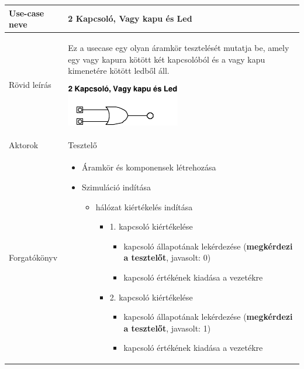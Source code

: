 	\begin{longtable}{| l | p{12cm} |}
	\hline
	\textbf{Use-case neve}   & {2 Kapcsoló, Vagy kapu és Led} \tabularnewline
	\hline\hline
	Rövid leírás    & {Ez a usecase egy olyan áramkör tesztelését mutatja be, amely egy vagy kapura kötött két kapcsolóból és a vagy kapu kimenetére kötött ledből áll.\newline
\begin{center}
\vspace{-15pt}
\includegraphics[scale=1.5]{dw/circuit_test3.pdf}
\vspace{-10pt}
\end{center}} \tabularnewline
	\hline
	Aktorok         & {Tesztelő} \tabularnewline
	\hline
	Forgatókönyv    &  \vspace{-15pt}
\begin{itemize}
\setlength{\itemsep}{0cm}%
\setlength{\parskip}{0cm}%
\setlength{\itemindent}{-10pt}%
\item Áramkör és komponensek létrehozása
\item Szimuláció indítása
\begin{itemize}
\setlength{\itemsep}{0cm}%
\setlength{\parskip}{0cm}%
\setlength{\itemindent}{-25pt}%
\item hálózat kiértékelés indítása
\begin{itemize}
\setlength{\itemsep}{0cm}%
\setlength{\parskip}{0cm}%
\setlength{\itemindent}{-25pt}%
	\item 1. kapcsoló kiértékelése
	\begin{itemize}
	\setlength{\itemsep}{0cm}%
	\setlength{\parskip}{0cm}%
	\setlength{\itemindent}{-25pt}%
		\item kapcsoló állapotának lekérdezése (\textbf{megkérdezi a tesztelőt}, javasolt: 0)
		\item kapcsoló értékének kiadása a vezetékre
	\end{itemize}
	\item 2. kapcsoló kiértékelése
	\begin{itemize}
	\setlength{\itemsep}{0cm}%
	\setlength{\parskip}{0cm}%
	\setlength{\itemindent}{-25pt}%
		\item kapcsoló állapotának lekérdezése (\textbf{megkérdezi a tesztelőt}, javasolt: 1)
		\item kapcsoló értékének kiadása a vezetékre

\end{itemize}
\end{itemize}
\end{itemize}
\end{itemize}
\end{longtable}

